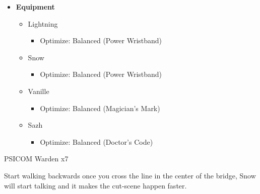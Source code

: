 \begin{multicols}{2}
\begin{menu}
\begin{itemize}
    \item \textbf{Equipment}
    \begin{itemize}
        \item Lightning
        \begin{itemize}
            \item Optimize: Balanced (Power Wristband)
        \end{itemize}
        \item Snow
        \begin{itemize}
            \item Optimize: Balanced (Power Wristband)
        \end{itemize}
        \item Vanille
        \begin{itemize}
            \item Optimize: Balanced (Magician's Mark)
        \end{itemize}
        \item Sazh
        \begin{itemize}
            \item Optimize: Balanced (Doctor's Code)
        \end{itemize}
    \end{itemize}
\end{itemize}
\end{menu}
\vfill
\renewcommand{\first}{[1] Tri-Disaster (\rav/\rav/\rav)}

\renewcommand{\second}{[2] Solidarity (\com/\sen/\med)}

\renewcommand{\third}{[3] Aggression (\com/\com/\rav)}

\renewcommand{\fourth}{[4] Aggression (\com/\com/\rav)}

\begin{battle}{PSICOM Warden x7}
 
\end{battle}

Start walking backwards once you cross the line in the center of the bridge, Snow will start talking and it makes the cut-scene happen faster.


\end{multicols}
